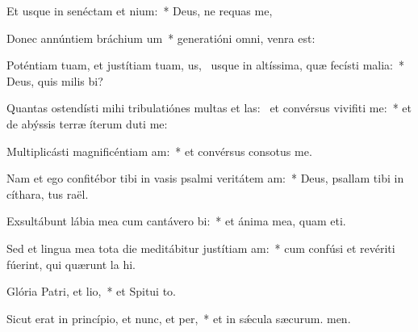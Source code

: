 \item Et usque in senéctam et nium:~* Deus, ne requas me,
\item Donec annúntiem bráchium um~* generatióni omni,  venra est:
\item Poténtiam tuam, et justítiam tuam, us,~\pscross{} usque in altíssima, quæ fecísti malia:~* Deus, quis milis bi?
\item Quantas ostendísti mihi tribulatiónes multas et las:~\pscross{} et convérsus vivifiti me:~* et de abýssis terræ íterum duti me:
\item Multiplicásti magnificéntiam am:~* et convérsus consotus  me.
\item Nam et ego confitébor tibi in vasis psalmi veritátem am:~* Deus, psallam tibi in cíthara, tus raël.
\item Exsultábunt lábia mea cum cantávero bi:~* et ánima mea, quam eti.
\item Sed et lingua mea tota die meditábitur justítiam am:~* cum confúsi et revériti fúerint, qui quærunt la hi.
\item Glória Patri, et lio,~* et Spitui to.
\item Sicut erat in princípio, et nunc, et per,~* et in sǽcula sæcurum. men.
